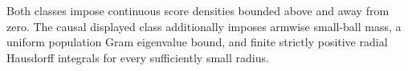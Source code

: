 Both classes impose continuous score densities bounded above and away from zero.  The causal displayed class additionally imposes armwise small-ball mass, a uniform population Gram eigenvalue bound, and finite strictly positive radial Hausdorff integrals for every sufficiently small radius.